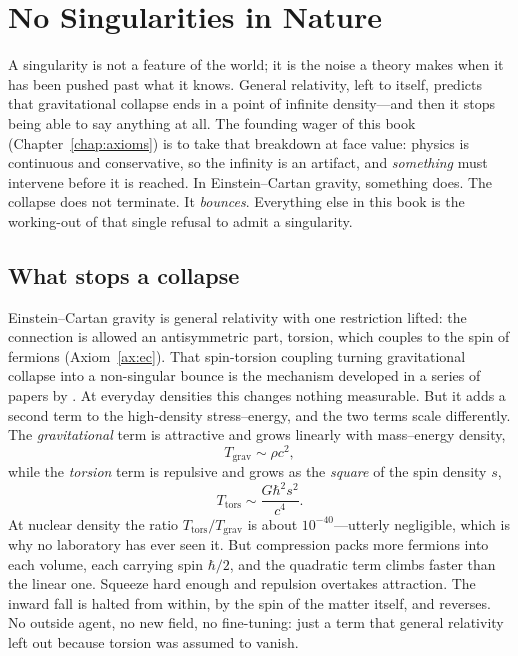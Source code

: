 \chapter{No Singularities in Nature}
\label{chap:bounce}

A singularity is not a feature of the world; it is the noise a theory makes when
it has been pushed past what it knows. General relativity, left to itself,
predicts that gravitational collapse ends in a point of infinite density---and
then it stops being able to say anything at all. The founding wager of this book
(Chapter~\ref{chap:axioms}) is to take that breakdown at face value: physics is
continuous and conservative, so the infinity is an artifact, and \emph{something}
must intervene before it is reached. In Einstein--Cartan gravity, something does.
The collapse does not terminate. It \emph{bounces}. Everything else in this book
is the working-out of that single refusal to admit a singularity.

\section{What stops a collapse}

Einstein--Cartan gravity is general relativity with one restriction lifted: the
connection is allowed an antisymmetric part, torsion, which couples to the spin
of fermions (Axiom~\ref{ax:ec}). That spin-torsion coupling turning gravitational
collapse into a non-singular bounce is the mechanism developed in a series of
papers by \citet{poplawski2010,poplawski2012}. At everyday densities this changes
nothing measurable. But it adds a second term to the high-density stress--energy, and the
two terms scale differently. The \emph{gravitational} term is attractive and
grows linearly with mass--energy density,
\[
  T_{\mathrm{grav}} \sim \rho c^2 ,
\]
while the \emph{torsion} term is repulsive and grows as the \emph{square} of the
spin density $s$,
\[
  T_{\mathrm{tors}} \sim \frac{G\hbar^2 s^2}{c^4} .
\]
At nuclear density the ratio $T_{\mathrm{tors}}/T_{\mathrm{grav}}$ is about
$10^{-40}$---utterly negligible, which is why no laboratory has ever seen it. But
compression packs more fermions into each volume, each carrying spin $\hbar/2$,
and the quadratic term climbs faster than the linear one. Squeeze hard enough and
repulsion overtakes attraction. The inward fall is halted from within, by the
spin of the matter itself, and reverses. No outside agent, no new field, no
fine-tuning: just a term that general relativity left out because torsion was
assumed to vanish.

